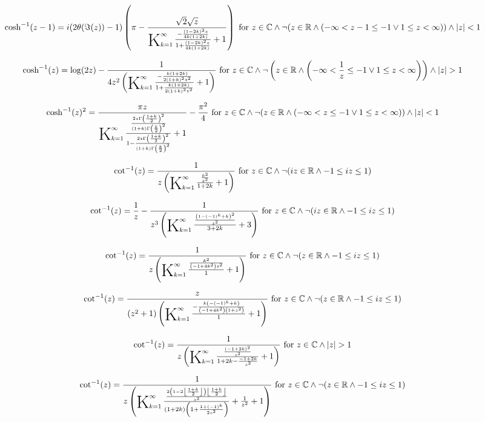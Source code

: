 \documentclass{article}
\newcommand{\bigK}{\mathop{\raisebox{-5pt}{\huge K}}}
\begin{document}
\[\cosh ^{-1}(z-1)=i (2 \theta (\Im(z))-1) \left(\pi -\frac{\sqrt{2} \sqrt{z}}{\bigK_{k=1}^{\infty}\frac{-\frac{(1-2 k)^2 z}{4 k (1+2 k)}}{1+\frac{(1-2 k)^2 z}{4 k (1+2 k)}}+1}\right)\text{ for }z\in \mathbb{C}\land \neg (z\in \mathbb{R}\land (-\infty <z-1\leq -1\lor 1\leq z<\infty ))\land \left| z\right| <1\] 

\[\cosh ^{-1}(z)=\log (2 z)-\frac{1}{4 z^2 \left(\bigK_{k=1}^{\infty}\frac{-\frac{k (1+2 k)}{2 (1+k)^2 z^2}}{1+\frac{k (1+2 k)}{2 (1+k)^2 z^2}}+1\right)}\text{ for }z\in \mathbb{C}\land \neg \left(z\in \mathbb{R}\land \left(-\infty <\frac{1}{z}\leq -1\lor 1\leq z<\infty \right)\right)\land \left| z\right| >1\] 

\[\cosh ^{-1}(z)^2=\frac{\pi  z}{\bigK_{k=1}^{\infty}\frac{\frac{2 z \Gamma \left(\frac{1+k}{2}\right)^2}{(1+k) \Gamma \left(\frac{k}{2}\right)^2}}{1-\frac{2 z \Gamma \left(\frac{1+k}{2}\right)^2}{(1+k) \Gamma \left(\frac{k}{2}\right)^2}}+1}-\frac{\pi ^2}{4}\text{ for }z\in \mathbb{C}\land \neg (z\in \mathbb{R}\land (-\infty <z\leq -1\lor 1\leq z<\infty ))\land \left| z\right| <1\] 

\[\cot ^{-1}(z)=\frac{1}{z \left(\bigK_{k=1}^{\infty}\frac{\frac{k^2}{z^2}}{1+2 k}+1\right)}\text{ for }z\in \mathbb{C}\land \neg (i z\in \mathbb{R}\land -1\leq i z\leq 1)\] 

\[\cot ^{-1}(z)=\frac{1}{z}-\frac{1}{z^3 \left(\bigK_{k=1}^{\infty}\frac{\frac{\left(1-(-1)^k+k\right)^2}{z^2}}{3+2 k}+3\right)}\text{ for }z\in \mathbb{C}\land \neg (i z\in \mathbb{R}\land -1\leq i z\leq 1)\] 

\[\cot ^{-1}(z)=\frac{1}{z \left(\bigK_{k=1}^{\infty}\frac{\frac{k^2}{\left(-1+4 k^2\right) z^2}}{1}+1\right)}\text{ for }z\in \mathbb{C}\land \neg (z\in \mathbb{R}\land -1\leq i z\leq 1)\] 

\[\cot ^{-1}(z)=\frac{z}{\left(z^2+1\right) \left(\bigK_{k=1}^{\infty}\frac{-\frac{k \left(-(-1)^k+k\right)}{\left(-1+4 k^2\right) \left(1+z^2\right)}}{1}+1\right)}\text{ for }z\in \mathbb{C}\land \neg (z\in \mathbb{R}\land -1\leq i z\leq 1)\] 

\[\cot ^{-1}(z)=\frac{1}{z \left(\bigK_{k=1}^{\infty}\frac{\frac{(-1+2 k)^2}{z^2}}{1+2 k-\frac{-1+2 k}{z^2}}+1\right)}\text{ for }z\in \mathbb{C}\land \left| z\right| >1\] 

\[\cot ^{-1}(z)=\frac{1}{z \left(\bigK_{k=1}^{\infty}\frac{\frac{2 \left(1-2 \left\lfloor \frac{1+k}{2}\right\rfloor \right) \left\lfloor \frac{1+k}{2}\right\rfloor }{z^2}}{(1+2 k) \left(1+\frac{1+(-1)^k}{2 z^2}\right)}+\frac{1}{z^2}+1\right)}\text{ for }z\in \mathbb{C}\land \neg (z\in \mathbb{R}\land -1\leq i z\leq 1)\] 
\end{document}
